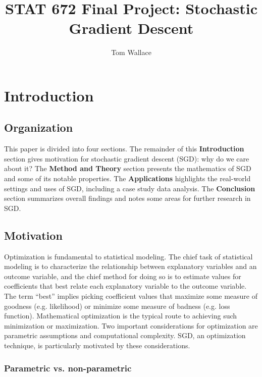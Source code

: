 \documentclass{article}
\author{Tom Wallace}
\title{STAT 672 Final Project: Stochastic Gradient Descent}
\begin{document}
\maketitle

\section{Introduction}

\subsection{Organization}

This paper is divided into four sections. The remainder of this
\textbf{Introduction} section gives motivation for stochastic gradient descent (SGD):
why do we care about it? The \textbf{Method and Theory} section presents the
mathematics of SGD and some of its notable properties. The
\textbf{Applications} highlights the real-world settings and uses of SGD,
including a case study data analysis. The \textbf{Conclusion} section summarizes
overall findings and notes some areas for further research in SGD.

\subsection{Motivation}

Optimization is fundamental to statistical modeling. The chief task of
statistical modeling is to characterize the relationship between 
explanatory variables and an outcome variable, and the chief method for doing so
is to estimate values for coefficients that best relate
each explanatory variable to the outcome variable. The term ``best''
implies picking coefficient values that
maximize some measure of goodness (e.g. likelihood) or minimize some measure of
badness (e.g. loss function). 
Mathematical optimization is the typical
route to achieving such minimization or maximization. Two important
considerations for optimization are parametric assumptions and computational
complexity. SGD, an optimization technique, is
particularly motivated by these considerations.

\subsubsection{Parametric vs. non-parametric}
\end{document}
